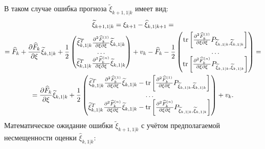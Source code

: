 В таком случае ошибка прогноза $\widetilde{\xi}_{k+1,1|k}$ имеет вид:
\begin{multline} \label{equation:filtering:in_states:extended_kalman:prediction_error}
    \widetilde{\xi}_{k+1,1|k} = \xi_{k+1} - \widehat{\xi}_{k,1|k+1} = \\
    = \widehat{F}_k
        + \frac{\partial \widehat{F}_k}{\partial \xi} \widetilde{\xi}_{k,1|k}
        + \frac{1}{2}
            \begin{pmatrix}
                \widetilde{\xi}_{k,1|k}^T \frac{\partial^2 \widehat{F}_k^{(1)}}{{\partial \xi}{\partial \xi}} \widetilde{\xi}_{k,1|k} \\
                \dots \\
                \widetilde{\xi}_{k,1|k}^T \frac{\partial^2 \widehat{F}_k^{(n)}}{{\partial \xi}{\partial \xi}} \widetilde{\xi}_{k,1|k}
            \end{pmatrix}
        + v_k
        - \widehat{F}_k
        - \frac{1}{2}
            \begin{pmatrix}
                \mathrm{tr} \left [ \frac{\partial^2 \widehat{F}_k^{(1)}}{{\partial \xi}{\partial \xi}} P_{\widetilde{\xi}_{k,1|k}, \widetilde{\xi}_{k,1|k}} \right ] \\
                \dots \\
                \mathrm{tr} \left [ \frac{\partial^2 \widehat{F}_k^{(n)}}{{\partial \xi}{\partial \xi}} P_{\widetilde{\xi}_{k,1|k}, \widetilde{\xi}_{k,1|k}} \right ]
            \end{pmatrix} = \\
    = \frac{\partial \widehat{F}_k}{\partial \xi} \widetilde{\xi}_{k,1|k}
        + \frac{1}{2}
            \begin{pmatrix}
                \widetilde{\xi}_{k,1|k}^T \frac{\partial^2 \widehat{F}_k^{(1)}}{{\partial \xi}{\partial \xi}} \widetilde{\xi}_{k,1|k} - \mathrm{tr} \left [ \frac{\partial^2 \widehat{F}_k^{(1)}}{{\partial \xi}{\partial \xi}} P_{\widetilde{\xi}_{k,1|k}, \widetilde{\xi}_{k,1|k}} \right ] \\
                \dots \\
                \widetilde{\xi}_{k,1|k}^T \frac{\partial^2 \widehat{F}_k^{(n)}}{{\partial \xi}{\partial \xi}} \widetilde{\xi}_{k,1|k} - \mathrm{tr} \left [ \frac{\partial^2 \widehat{F}_k^{(n)}}{{\partial \xi}{\partial \xi}} P_{\widetilde{\xi}_{k,1|k}, \widetilde{\xi}_{k,1|k}} \right ]
            \end{pmatrix}
        + v_k
    .
\end{multline}
Математическое ожидание ошибки $\widetilde{\xi}_{k+1,1|k}$ с учётом предполагаемой несмещенности оценки $\widehat{\xi}_{k,1|k}$:
